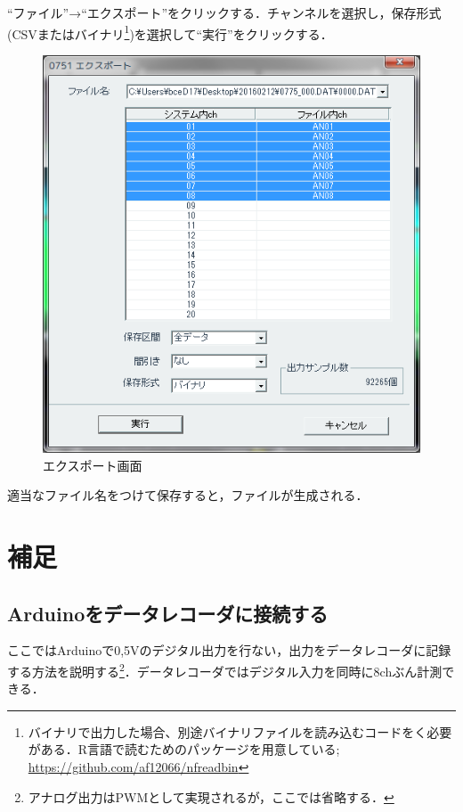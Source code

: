\documentclass[a4j, twocolumn, openleft, uplatex, dvipdfmx]{jsbook}
\begin{document}
        ``ファイル''→``エクスポート''をクリックする．チャンネルを選択し，保存形式(CSVまたはバイナリ\footnote{バイナリで出力した場合、別途バイナリファイルを読み込むコードをく必要がある．R言語で読むためのパッケージを用意している; \url{https://github.com/af12066/nfreadbin}})を選択して``実行''をクリックする．

        \begin{figure}[H]
            \centering
            \includegraphics[width=\linewidth]{./figure/0751-export.png}
            \caption{エクスポート画面}
        \end{figure}
        適当なファイル名をつけて保存すると，ファイルが生成される．
    \chapter{補足}
    \label{chap:補足}

        \section{Arduinoをデータレコーダに接続する}
        \label{sec:Arduinoをデータレコーダに接続する}

        ここではArduinoで0,5Vのデジタル出力を行ない，出力をデータレコーダに記録する方法を説明する\footnote{アナログ出力はPWMとして実現されるが，ここでは省略する．}．データレコーダではデジタル入力を同時に8chぶん計測できる．
\end{document}

